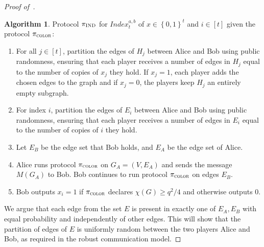 \documentclass[11pt]{article}
\theoremstyle{definition}
\newenvironment{ourbox}{\begin{mdframed}[hidealllines=false,innerleftmargin=10pt,backgroundcolor=white!10,innertopmargin=5pt,innerbottommargin=5pt,roundcorner=10pt]}{\end{mdframed}}
\newtheorem{mdalgorithm}{Algorithm}
\newenvironment{Algorithm}{\begin{ourbox}\begin{mdalgorithm}}{\end{mdalgorithm}\end{ourbox}}
\renewcommand{\geq}{\geqslant}
\newcommand{\set}[1]{\ensuremath{\left\{ #1 \right\}}}
\newcommand{\prot}{\ensuremath{\pi}}
\newcommand{\protindex}{\ensuremath{\prot_{\textnormal{\textsc{IND}}}}}
\begin{document}
\begin{proof}[Proof of~]

	\begin{Algorithm}\label{alg:prot-robust-index}
	Protocol $\protindex$ for $Index^{a,b}_t$ of $x \in \set{0,1}^t $ and $ i \in [t]$ given the protocol $\pi_{\textsc{color}}$: 
		~\vspace{-0.5cm}
		\begin{enumerate}

			\item For all $j\in [t]$, partition the edges of $H_j$ between Alice and Bob using public randomness, ensuring that each player receives a number of edges in $H_j$ equal to the number of copies of $x_j$ they hold.
			If $x_j=1$, each player adds the chosen edges to the graph and if $x_j = 0$, the players keep $H_j$ an entirely empty subgraph. 	
		
			\item For index $i$, partition the edges of $E_i$ between Alice and Bob using public randomness, ensuring that each player receives a number of edges in $E_i$ equal to the number of copies of $i$ they hold.
			
			\item Let $E_B$ be the edge set that Bob holds, and $E_A$ be the edge set of Alice.
			
			\item Alice runs protocol $\pi_{\textsc{color}}$ on $G_A=(V, E_A)$ and sends the message $M(G_A)$ to Bob. Bob continues to run protocol $\pi_{\textsc{color}}$ on edges $E_B$.  
			\item Bob outputs $x_i=1$ if $\pi_{\textsc{color}}$ declares $\chi(G)\geq q^2/4$ and otherwise outputs $0$.
		\end{enumerate}
	\end{Algorithm}
	
	We argue that each edge from the set $E$ is present in exactly one of $E_A, E_B$ with equal probability and independently of other edges. This will show that the partition of edges of $E$ is uniformly random between the two players Alice and Bob, 
	as required in the robust communication model.  


\end{proof}
\end{document}
